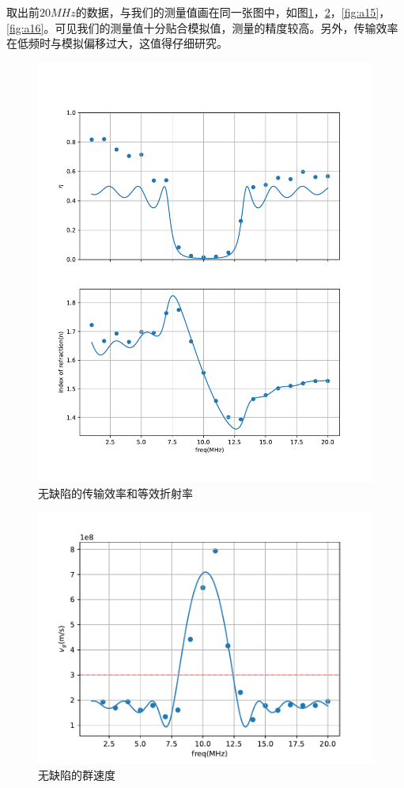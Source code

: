 \documentclass[fleqn,10pt]{SelfArx} %
\begin{document}
取出前$20MHz$的数据，与我们的测量值画在同一张图中，如图\ref{fig:a13}，\ref{fig:a14}，\ref{fig:a15}，\ref{fig:a16}。可见我们的测量值十分贴合模拟值，测量的精度较高。另外，传输效率在低频时与模拟偏移过大，这值得仔细研究。
\begin{figure}[htbp]
	\centering
	\includegraphics[width=\linewidth]{normal-eta-n.pdf}
	\caption{无缺陷的传输效率和等效折射率}
	\label{fig:a13}
\end{figure}
\begin{figure}[htbp]
	\centering
	\includegraphics[width=\linewidth]{normal-vg.pdf}
	\caption{无缺陷的群速度}
	\label{fig:a14}
\end{figure}
\end{document}
